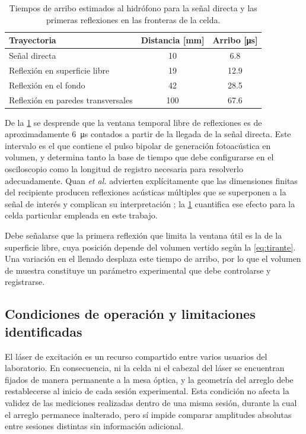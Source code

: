 \begin{table}[H]
  \centering
  \caption{Tiempos de arribo estimados al hidrófono para la señal
           directa y las primeras reflexiones en las fronteras de la
           celda.}
  \label{tab:tiempos_celda}
  \begin{tabular}{lcc}
    \toprule
    \textbf{Trayectoria} & \textbf{Distancia [\si{\milli\meter}]}
    & \textbf{Arribo [\si{\micro\second}]} \\
    \midrule
    Señal directa                       & 10  & 6.8  \\
    Reflexión en superficie libre       & 19  & 12.9 \\
    Reflexión en el fondo               & 42  & 28.5 \\
    Reflexión en paredes transversales  & 100 & 67.6 \\
    \bottomrule
  \end{tabular}
\end{table}

De la \cref{tab:tiempos_celda} se desprende que la ventana temporal
libre de reflexiones es de aproximadamente \SI{6}{\micro\second}
contados a partir de la llegada de la señal directa. Este intervalo
es el que contiene el pulso bipolar de generación fotoacústica en
volumen, y determina tanto la base de tiempo que debe configurarse
en el osciloscopio como la longitud de registro necesaria para
resolverlo adecuadamente. Quan \textit{et al.} advierten
explícitamente que las dimensiones finitas del recipiente producen
reflexiones acústicas múltiples que se superponen a la señal de
interés y complican su interpretación \cite{Quan1994}; la
\cref{tab:tiempos_celda} cuantifica ese efecto para la celda
particular empleada en este trabajo.

Debe señalarse que la primera reflexión que limita la ventana útil es
la de la superficie libre, cuya posición depende del volumen vertido
según la \cref{eq:tirante}. Una variación en el llenado desplaza este
tiempo de arribo, por lo que el volumen de muestra constituye un
parámetro experimental que debe controlarse y registrarse.

\subsection*{Condiciones de operación y limitaciones identificadas}

El láser de excitación es un recurso compartido entre varios usuarios
del laboratorio. En consecuencia, ni la celda ni el cabezal del láser
se encuentran fijados de manera permanente a la mesa óptica, y la
geometría del arreglo debe restablecerse al inicio de cada sesión
experimental. Esta condición no afecta la validez de las mediciones
realizadas dentro de una misma sesión, durante la cual el arreglo
permanece inalterado, pero sí impide comparar amplitudes absolutas
entre sesiones distintas sin información adicional.

